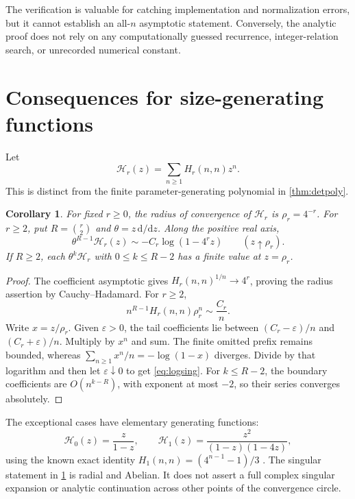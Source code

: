 \documentclass[11pt]{article}
\numberwithin{equation}{section}
\newtheorem{corollary}[corollary]{Corollary}
\theoremstyle{definition}
\newcommand{\dd}{\mathrm{d}}
\begin{document}
The verification is valuable for catching implementation and normalization errors, but it cannot establish an all-$n$ asymptotic statement. Conversely, the analytic proof does not rely on any computationally guessed recurrence, integer-relation search, or unrecorded numerical constant.

\section{Consequences for size-generating functions}\label{sec:generating}

Let
\begin{equation}\label{eq:sizeGF}
 \mathcal H_r(z)=\sum_{n\geq1}H_r(n,n)z^n.
\end{equation}
This is distinct from the finite parameter-generating polynomial in \cref{thm:detpoly}.

\begin{corollary}\label{cor:radius}
For fixed $r\geq0$, the radius of convergence of $\mathcal H_r$ is $\rho_r=4^{-r}$. For $r\geq2$, put $R=\binom r2$ and $\theta=z\,\dd/\dd z$. Along the positive real axis,
\begin{equation}\label{eq:logsing}
 \theta^{R-1}\mathcal H_r(z)
 \sim-C_r\log(1-4^rz)\qquad(z\uparrow\rho_r).
\end{equation}
If $R\geq2$, each $\theta^k\mathcal H_r$ with $0\leq k\leq R-2$ has a finite value at $z=\rho_r$.
\end{corollary}

\begin{proof}
The coefficient asymptotic gives $H_r(n,n)^{1/n}\to4^r$, proving the radius assertion by Cauchy--Hadamard. For $r\geq2$,
\[
 n^{R-1}H_r(n,n)\rho_r^n\sim\frac{C_r}{n}.
\]
Write $x=z/\rho_r$. Given $\varepsilon>0$, the tail coefficients lie between $(C_r-\varepsilon)/n$ and $(C_r+\varepsilon)/n$. Multiply by $x^n$ and sum. The finite omitted prefix remains bounded, whereas $\sum_{n\geq1}x^n/n=-\log(1-x)$ diverges. Divide by that logarithm and then let $\varepsilon\downarrow0$ to get \eqref{eq:logsing}. For $k\leq R-2$, the boundary coefficients are $O(n^{k-R})$, with exponent at most $-2$, so their series converges absolutely.
\end{proof}

The exceptional cases have elementary generating functions:
\[
 \mathcal H_0(z)=\frac{z}{1-z},\qquad
 \mathcal H_1(z)=\frac{z^2}{(1-z)(1-4z)},
\]
using the known exact identity $H_1(n,n)=(4^{n-1}-1)/3$ \cite[Theorem~1]{DK}. The singular statement in \cref{cor:radius} is radial and Abelian. It does not assert a full complex singular expansion or analytic continuation across other points of the convergence circle.
\end{document}
